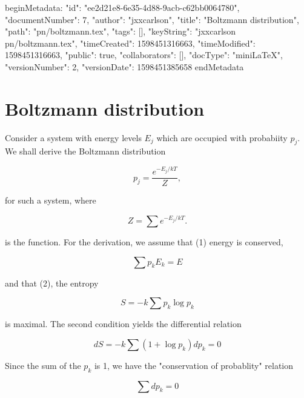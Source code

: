 beginMetadata:
{
    "id": "ee2d21e8-6e35-4d88-9acb-c62bb0064780",
    "documentNumber": 7,
    "author": "jxxcarlson",
    "title": "Boltzmann distribution",
    "path": "pn/boltzmann.tex",
    "tags": [],
    "keyString": "jxxcarlson pn/boltzmann.tex",
    "timeCreated": 1598451316663,
    "timeModified": 1598451316663,
    "public": true,
    "collaborators": [],
    "docType": "miniLaTeX",
    "versionNumber": 2,
    "versionDate": 1598451385658
}
endMetadata

\setcounter{section}{3}

\section{Boltzmann distribution}

Consider a system with energy levels $E_j$ which
are occupied with probabiity $p_j$. We shall
derive the Boltzmann distribution

\begin{equation}
p_j= \frac{e^{-E_j/kT}}{Z},
\end{equation}

for such a system, where

\begin{equation}
Z = \sum e^{-  E_j/kT}.
\end{equation}

is the  function.
For the derivation, we assume that (1) energy is conserved,

\begin{equation}
\label{eq:conservedEnergy}
 \sum p_kE_k = E
\end{equation}

and that (2), the entropy

\begin{equation}
S = - k \sum p_k \log p_k
\end{equation}

is maximal.  The second condition yields the differential relation

\begin{equation}
dS = - k \sum (1 +\log p_k)  dp_k = 0
\end{equation}


Since the sum of the $p_k$ is 1, we have the "conservation of probablity" relation

\begin{equation}
\label{eq:consprob}
\sum dp_k = 0
\end{equation}

